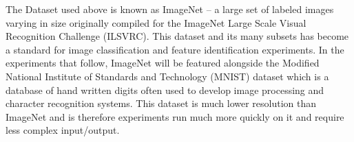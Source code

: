 The Dataset used above is known as ImageNet -- a large set of labeled images varying in size originally compiled for the ImageNet Large Scale Visual Recognition Challenge (ILSVRC). This dataset and its many subsets has become a standard for image classification and feature identification experiments. In the experiments that follow, ImageNet will be featured alongside the Modified National Institute of Standards and Technology (MNIST) dataset which is a database of hand written digits often used to develop image processing and character recognition systems. This dataset is much lower resolution than ImageNet and is therefore experiments run much more quickly on it and require less complex input/output.  





